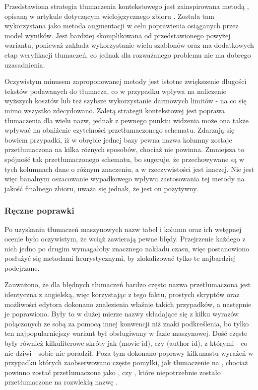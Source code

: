 Przedstawiona strategia tłumaczenia kontekstowego jest zainspirowana metodą , opisaną w artykule dotyczącym wielojęzycznego zbioru  \cite{Dou2022}. Została tam wykorzystana jako metoda augmentacji w celu poprawienia osiąganych przez model wyników. Jest bardziej skomplikowana od przedstawionego powyżej wariantu, ponieważ zakłada wykorzystanie wielu szablonów oraz ma dodatkowych etap weryfikacji tłumaczeń, co jednak dla rozważanego problemu nie ma dobrego uzasadnienia.

Oczywistym minusem zaproponowanej metody jest istotne zwiększenie długości tekstów podawanych do tłumacza, co w przypadku  wpływa na naliczenie wyższych kosztów lub też szybsze wykorzystanie darmowych limitów - na co się mimo wszystko zdecydowano. Zaletą strategii kontekstowej jest poprawa tłumaczenia dla wielu nazw, jednak z pewnego punktu widzenia może ona także wpływać na obniżenie czytelności przetłumaczonego schematu. Zdarzają się bowiem przypadki, iż w obrębie jednej bazy pewna nazwa kolumny zostaje przetłumaczona na kilka różnych sposobów, chociaż nie powinna. Zmniejsza to spójność tak przetłumaczonego schematu, bo sugeruje, że przechowywane są w tych kolumnach dane o różnym znaczeniu, a w rzeczywistości jest inaczej. Nie jest więc banalnym oszacowanie wypadkowego wpływu zastosowania tej metody na jakość finalnego zbioru, uważa się jednak, że jest on pozytywny.

\subsubsection{Ręczne poprawki}
Po uzyskaniu tłumaczeń maszynowych nazw tabel i kolumn oraz ich wstępnej ocenie było oczywistym, że wciąż zawierają pewne błędy. Przejrzenie każdego z nich jedno po drugim wymagałoby znacznego nakładu czasu, więc postanowiono posłużyć się metodami heurystycznymi, by zlokalizować tylko te najbardziej podejrzane. 

Zauważono, że dla błędnych tłumaczeń bardzo często nazwa przetłumaczona jest identyczna z angielską, więc korzystając z tego faktu, prostych skryptów oraz możliwości edytora  dokonano znalezienia właśnie takich przypadków, a następnie je poprawiono. Były to w dużej mierze nazwy składające się z kilku wyrazów połączonych ze sobą za pomocą innej konwencji niż znaki podkreślenia, bo tylko ten najpopularniejszy wariant był obsługiwany w fazie maszynowej. Dość częste były również kilkuliterowe skróty jak  (movie id), czy  (author id), z którymi - co nie dziwi -  sobie nie poradził. Poza tym dokonano poprawy kilkunastu wyrażeń w przypadku których zaobserwowano częste pomyłki, jak tłumaczenie  na , chociaż powinno zostać przetłumaczone jako , czy , które niepotrzebnie zostało przetłumaczone na rozwlekłą nazwę .


